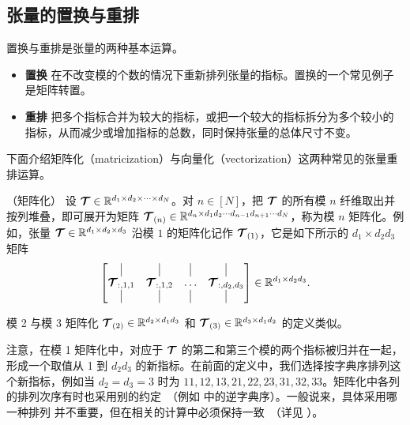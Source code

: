 \subsection{张量的置换与重排}
置换与重排是张量的两种基本运算。
\begin{itemize}
    \item \textbf{置换} 在不改变模的个数的情况下重新排列张量的指标。置换的一个常见例子是矩阵转置。
    \item  \textbf{重排} 把多个指标合并为较大的指标，或把一个较大的指标拆分为多个较小的指标，从而减少或增加指标的总数，同时保持张量的总体尺寸不变。
\end{itemize}
下面介绍矩阵化（matricization）与向量化（vectorization）这两种常见的张量重排运算。
\begin{definition}（矩阵化）\label{matricizitation:def}
设 $\bm{\mathcal{T}}\in\mathbb{R}^{d_1\times d_2\times \cdots\times d_N}$。对 $n\in[N]$，把 $\bm{\mathcal{T}}$ 的所有模 $n$ 纤维取出并按列堆叠，即可展开为矩阵 $\bm{\mathcal{T}}_{(n)}\in\mathbb{R}^{d_n\times d_1d_2\cdots d_{n-1}d_{n+1}\cdots d_N}$，称为模 $n$ 矩阵化。例如，张量 $\bm{\mathcal{T}}\in\mathbb{R}^{d_1\times d_2\times d_3}$ 沿模 $1$ 的矩阵化记作 $\bm{\mathcal{T}}_{(1)}$，它是如下所示的 $d_1\times d_2d_3$ 矩阵
$$
    \begin{bmatrix}
    \vline & \vline & \vline  & \vline \\
    \Tt_{:,1,1} & {\Tt}_{:,1,2}  & \dots  & {\Tt}_{:,d_2,d_3} \\
    \vline & \vline & \vline  & \vline 
    \end{bmatrix}
\in\RR^{d_1\times d_2d_3}.
$$

模 2 与模 3 矩阵化 $\bm{\mathcal{T}}_{(2)}\in\mathbb{R}^{d_2\times d_1d_3}$ 和 $\bm{\mathcal{T}}_{(3)}\in\mathbb{R}^{d_3\times d_1d_2}$ 的定义类似。
\end{definition}

注意，在模 1 矩阵化中，对应于 $\bm{\mathcal{T}}$ 的第二和第三个模的两个指标被归并在一起，形成一个取值从 1 到 $d_2d_3$ 的新指标。在前面的定义中，我们选择按字典序排列这个新指标，例如当 $d_2=d_3=3$ 时为 $11,12,13,21,22,23,31,32,33$。矩阵化中各列的排列次序有时也采用别的约定~（例如 \citep{kolda2009tensor} 中的逆字典序）。一般说来，具体采用哪一种排列
并不重要，但在相关的计算中必须保持一致~（详见 \citep{kolda2006multilinear}）。



